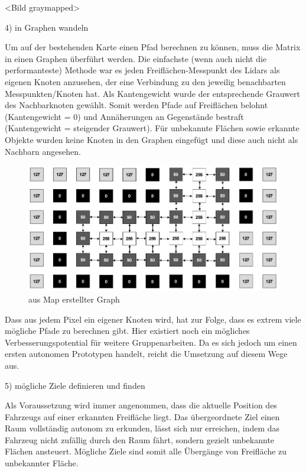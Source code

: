 <Bild graymapped>


4) in Graphen wandeln

Um auf der bestehenden Karte einen Pfad berechnen zu können, muss die Matrix in einen Graphen überführt werden. Die einfachste (wenn auch nicht die performanteste) Methode war es jeden Freiflächen-Messpunkt des Lidars als eigenen Knoten anzusehen, der eine Verbindung zu den jeweilig benachbarten Messpunkten/Knoten hat. Als Kantengewicht wurde der entsprechende Grauwert des Nachbarknoten gewählt. Somit werden Pfade auf Freiflächen belohnt (Kantengewicht = 0) und Annäherungen an Gegenstände bestraft (Kantengewicht = steigender Grauwert). 
Für unbekannte Flächen sowie erkannte Objekte wurden keine Knoten in den Graphen eingefügt und diese auch nicht als Nachbarn angesehen. 


\begin{figure}[h]
\begin{center}
\includegraphics[width=15cm]{images/chapter5/GraphKnoten.jpg}
\caption{aus Map erstellter Graph}
\label{Map_aus_Graph}
\end{center}
\end{figure}


Dass aus jedem Pixel ein eigener Knoten wird, hat zur Folge, dass es extrem viele mögliche Pfade zu berechnen gibt. Hier existiert noch ein mögliches Verbesserungspotential für weitere Gruppenarbeiten. Da es sich jedoch um einen ersten autonomen Prototypen handelt, reicht die Umsetzung auf diesem Wege aus.




5) mögliche Ziele definieren und finden

Als Voraussetzung wird immer angenommen, dass die aktuelle Position des Fahrzeugs auf einer erkannten Freifläche liegt. Das übergeordnete Ziel einen Raum vollständig autonom zu erkunden, lässt sich nur erreichen, indem das Fahrzeug nicht zufällig durch den Raum fährt, sondern gezielt unbekannte Flächen ansteuert. Mögliche Ziele sind somit alle Übergänge von Freifläche zu unbekannter Fläche. 

